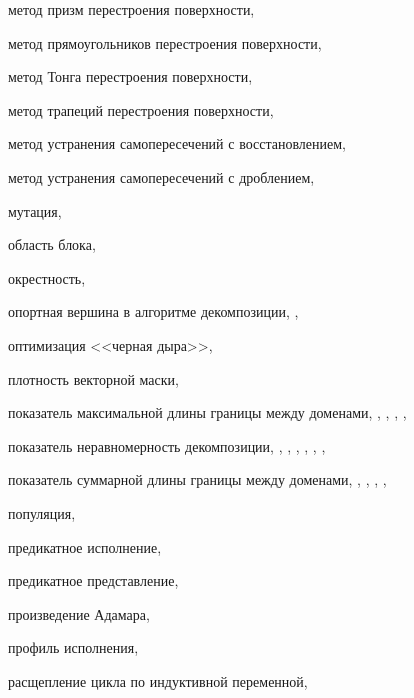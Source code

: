 метод призм перестроения поверхности, \pageref{term:method_remesh_prism}

метод прямоугольников перестроения поверхности, \pageref{term:method_remesh_rect}

метод Тонга перестроения поверхности, \pageref{term:method_remesh_tong}

метод трапеций перестроения поверхности, \pageref{term:method_remesh_trap}

метод устранения самопересечений с восстановлением, \pageref{term:method_selfint_repare}

метод устранения самопересечений с дроблением, \pageref{term:method_selfint_cut}

мутация, \pageref{term:mutation}

область блока, \pageref{term:block_scope}

окрестность, \pageref{term:okrestnost}

опортная вершина в алгоритме декомпозиции, \pageref{term:opor_point}, \pageref{term:opor_point2}

оптимизация <<черная дыра>>, \pageref{term:blackhome_optimization}

плотность векторной маски, \pageref{term:vector_mask_density}

показатель максимальной длины границы между доменами, \pageref{term:decomp_maxbord}, \pageref{term:decomp_maxbord2}, \pageref{term:decomp_maxbord3}, \pageref{term:decomp_maxbord4}, \pageref{term:decomp_maxbord5}

показатель неравномерность декомпозиции, \pageref{term:decomp_neravn}, \pageref{term:decomp_neravn2}, \pageref{term:decomp_neravn3}, \pageref{term:decomp_neravn4}, \pageref{term:decomp_neravn5}, \pageref{term:decomp_neravn6}, \pageref{term:decomp_neravn7}

показатель суммарной длины границы между доменами, \pageref{term:decomp_sumbord}, \pageref{term:decomp_sumbord2}, \pageref{term:decomp_sumbord3}, \pageref{term:decomp_sumbord4}, \pageref{term:decomp_sumbord5}

популяция, \pageref{term:population}

предикатное исполнение, \pageref{term:predicate_execution}

предикатное представление, \pageref{term:predicate_view}

произведение Адамара, \pageref{term:hadamar_mul}

профиль исполнения, \pageref{term:execution_profile}

расщепление цикла по индуктивной переменной, \pageref{term:loop_split_by_inductive}

